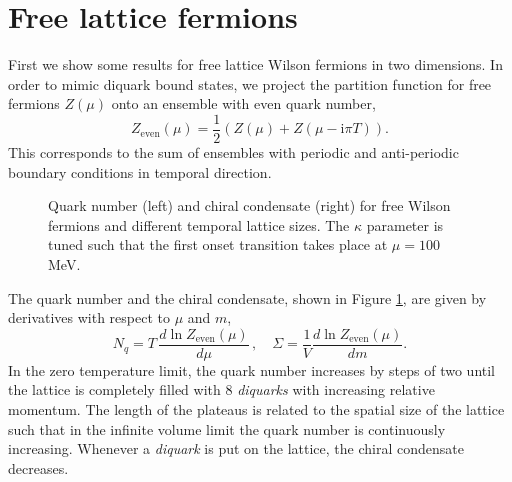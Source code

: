 \documentclass{PoS}
\newcommand{\ii}{\mathrm{i}}
\begin{document}
\section{Free lattice fermions}
\noindent
First we show some results for free lattice Wilson fermions in two dimensions. In order to mimic diquark bound states, we project the partition function for free fermions $Z(\mu)$ onto an ensemble with
even quark number,
\begin{equation}
 Z_\text{even}(\mu)=\frac{1}{2}\left(Z(\mu)+Z(\mu - \ii \pi T)\right).
\end{equation}
This corresponds to the sum of ensembles with periodic and anti-periodic boundary conditions in temporal direction. 
\begin{figure}[htb]
    \scalebox{1}{}\hskip10mm
    \scalebox{1}{}
  \caption{Quark number (left) and chiral condensate (right) for free Wilson fermions and different temporal lattice sizes. The $\kappa$ parameter is tuned such that the first onset transition takes place at $\mu=100$ MeV.} 
     \label{FreeFermions}
   \end{figure}
The quark number and the chiral condensate, shown in Figure \ref{FreeFermions}, are given by derivatives with respect to $\mu$ and $m$,
\begin{equation}
 N_q=T\,\frac{d \ln Z_\text{even}(\mu)}{d \mu}\,,\quad \Sigma=\frac{1}{V}\frac{d \ln Z_\text{even}(\mu)}{d m}.
\end{equation}
In the zero temperature limit, the quark number increases by steps of two until the lattice is completely filled with $8$ \emph{diquarks} with increasing relative momentum. 
The length of the plateaus is related to the spatial size of the lattice such that in the infinite volume limit the quark number is continuously increasing. Whenever a \emph{diquark} is put on the lattice,
the chiral condensate decreases.
\end{document}
